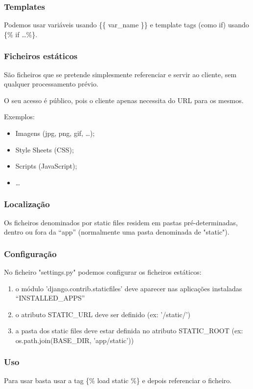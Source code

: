 \documentclass{article}
\begin{document}
\subsubsection{Templates}

\begin{flushleft}
  Podemos usar variáveis usando \{\{ var\_name \}\} e template tags (como if)
  usando \{\% if \dots \%\}.
\end{flushleft}

\pagebreak

\subsubsection{Ficheiros estáticos}

\begin{flushleft}
  São ficheiros que se pretende simplesmente referenciar e servir ao cliente,
  sem qualquer processamento prévio.

  O seu acesso é público, pois o cliente apenas necessita do URL para os mesmos.

  Exemplos:
  \begin{itemize}
    \item Imagens (jpg, png, gif, \dots);
    \item Style Sheets (CSS);
    \item Scripts (JavaScript);
    \item \dots
  \end{itemize}
\end{flushleft}

\subsubsection*{Localização}

\begin{flushleft}
Os ficheiros denominados por static files
residem em pastas pré-determinadas, dentro
ou fora da “app” (normalmente uma pasta denominada de "static").
\end{flushleft}

\subsubsection*{Configuração}

\begin{flushleft}
  No ficheiro "settings.py" podemos configurar os ficheiros estáticos:
  \begin{enumerate}
    \item o módulo 'django.contrib.staticfiles' deve aparecer
    nas aplicações instaladas “INSTALLED\_APPS”
    \item o atributo STATIC\_URL deve ser definido (ex: '/static/')
    \item a pasta dos static files deve estar definida no atributo STATIC\_ROOT
    (ex: os.path.join(BASE\_DIR, 'app/static'))
  \end{enumerate}
\end{flushleft}

\subsubsection*{Uso}

\begin{flushleft}
  Para usar basta usar a tag \{\% load static \%\} e depois
  referenciar o ficheiro.
\end{flushleft}
\end{document}
